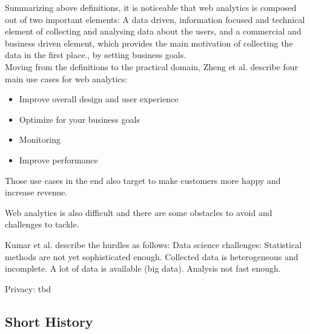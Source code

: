 


Summarizing above definitions, it is noticeable that web analytics is composed out of two important elements: A data driven, information focused and technical element of collecting and analysing data about the users, and a commercial and business driven element, which provides the main motivation of collecting the data in the first place., by setting business goals.
\\

Moving from the definitions to the practical domain, Zheng et al. describe four main use cases for web analytics:

\begin{itemize}
\item Improve overall design and user experience
\item Optimize for your business goals
\item Monitoring
\item Improve performance
\end{itemize}

Those use cases in the end also target to make customers more happy and increase revenue.


Web analytics is also difficult and there are some obstacles to avoid and challenges to tackle.

Kumar et al. describe the hurdles as follows:
Data science challenges:
Statistical methods are not yet sophisticated enough.
Collected data is heterogeneous and incomplete.
A lot of data is available (big data).
Analysis not fast enough.

Privacy: tbd






\subsection{Short History}

